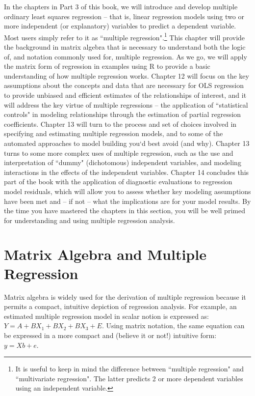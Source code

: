 \documentclass[11pt,openany]{book}\usepackage[]{graphicx}\usepackage[]{color}
\begin{document}
{In the chapters in Part 3 of this book, we will introduce and develop multiple ordinary least squares regression -- that is, linear regression models using two or more independent (or explanatory) variables to predict a dependent variable. Most users simply refer to it as ``multiple regression".\footnote{It is useful to keep in mind the difference between ``multiple regression" and ``multivariate regression". The latter predicts 2 or more dependent variables using an independent variable.} This chapter will provide the background in matrix algebra that is necessary to understand both the logic of, and notation commonly used for, multiple regression. As we go, we will apply the matrix form of regression in examples using R to provide a basic understanding of how multiple regression works.  Chapter 12 will focus on the key assumptions about the concepts and data that are necessary for OLS regression to provide unbiased and efficient estimates of the relationships of interest, and it will address the key virtue of multiple regressions -- the application of ``statistical controls" in modeling relationships through the estimation of partial regression coefficients. Chapter 13 will turn to the process and set of choices involved in specifying and estimating multiple regression models, and to some of the automated approaches to model building you`d best avoid (and why). Chapter 13 turns to some more complex uses of multiple regression, such as the use and interpretation of ``dummy" (dichotomous) independent variables, and modeling interactions in the effects of the independent variables.  Chapter 14 concludes this part of the book with the application of diagnostic evaluations to regression model residuals, which will allow you to assess whether key modeling assumptions have been met and -- if not -- what the implications are for your model results. By the time you have mastered the chapters in this section, you will be well primed for understanding and using multiple regression analysis.

\section{Matrix Algebra and Multiple Regression}

Matrix algebra is widely used for the derivation of multiple regression because it permits a compact, intuitive depiction of regression analysis. For
example, an estimated multiple regression model in scalar notion is expressed as: $Y = A + BX_1 + BX_2 + BX_3 + E$. Using matrix notation, 
the same equation can be expressed in a more compact and (believe it or not!) intuitive form: $y = Xb + e$.
 
}
\end{document}

